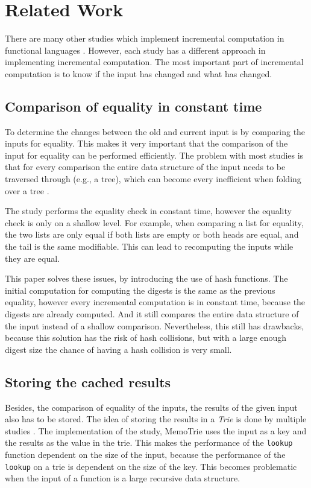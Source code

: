 \section{Related Work}

There are many other studies which implement incremental computation in functional languages\cite*{hinze2000memo} \cite*{acar2006adaptive} \cite*{firsov2016purely} \cite*{carlsson2002monads}. However, each study has a different approach in implementing incremental computation. The most important part of incremental computation is to know if the input has changed and what has changed. 

\subsection{Comparison of equality in constant time}
To determine the changes between the old and current input is by comparing the inputs for equality. This makes it very important that the comparison of the input for equality can be performed efficiently. The problem with most studies is that for every comparison the entire data structure of the input needs to be traversed through (e.g., a tree), which can become every inefficient when folding over a tree \cite*{hinze2000memo} \cite*{bransen2015incremental}. 

The study \cite*{carlsson2002monads} performs the equality check in constant time, however the equality check is only on a shallow level. For example, when comparing a list for equality, the two lists are only equal if both lists are empty or both heads are equal, and the tail is the same modifiable. This can lead to recomputing the inputs while they are equal. 

This paper solves these issues, by introducing the use of hash functions. The initial computation for computing the digests is the same as the previous equality, however every incremental computation is in constant time, because the digests are already computed. And it still compares the entire data structure of the input instead of a shallow comparison. Nevertheless, this still has drawbacks, because this solution has the risk of hash collisions, but with a large enough digest size the chance of having a hash collision is very small.

\subsection{Storing the cached results}
Besides, the comparison of equality of the inputs, the results of the given input also has to be stored. The idea of storing the results in a \textit{Trie} is done by multiple studies \cite*{hinze2000memo} \cite*{miraldo2019efficient}. The implementation of the \cite*{hinze2000memo} study, MemoTrie\cite*{hackage2022memotrie} uses the input as a key and the results as the value in the trie. This makes the performance of the \texttt{lookup} function dependent on the size of the input, because the performance of the \texttt{lookup} on a trie is dependent on the size of the key. This becomes problematic when the input of a function is a large recursive data structure. 

